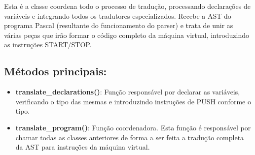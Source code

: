Esta é a classe coordena todo o processo de tradução, processando declarações de variáveis e integrando todos os tradutores especializados. Recebe a AST do programa Pascal (resultante do funcionamento do parser) e trata  de unir as várias peças que irão formar o código completo da máquina virtual, introduzindo as instruções START/STOP.

\subsection*{Métodos principais:}
\begin{itemize}
    \item \textbf{translate\_declarations()}: Função responsável por declarar as variáveis, verificando o tipo das mesmas e introduzindo instruções de PUSH conforme o tipo.
    \item \textbf{translate\_program()}: Função coordenadora. Esta função é responsável por chamar todas as classes anteriores de forma a ser feita a tradução completa da AST para instruções da máquina virtual.
\end{itemize}